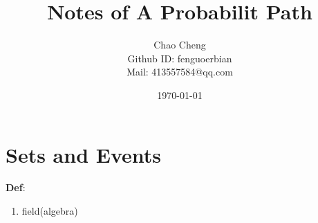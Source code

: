 \documentclass[a4paper,12pt]{article}
\title{Notes of A Probabilit Path}
\author{Chao Cheng
  \\
  Github ID: fenguoerbian
  \\
  Mail: 413557584@qq.com}
\date{\today}
\begin{document}
\maketitle

\section{Sets and Events}
\label{sec:sets-events}
\textbf{Def}:
\begin{enumerate}
\item field(algebra)
\end{enumerate}









\clearpage
\appendix
\end{document}
